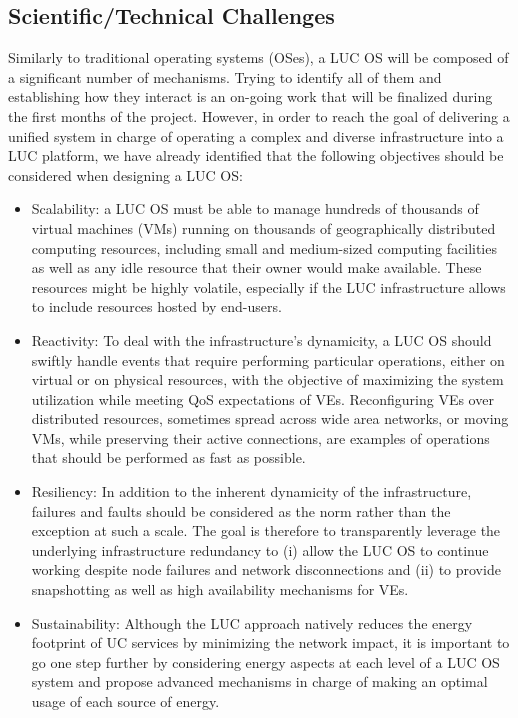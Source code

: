 \documentclass[11pt,a4paper,twoside]{article}
\begin{document}
\subsection{Scientific/Technical Challenges}
Similarly to traditional operating systems (OSes), a LUC OS will be composed of a
significant number of mechanisms. Trying to identify all of them and establishing how they
interact is an on-going work that will be finalized during the first months of the project. 
However, in order to reach the goal of delivering a unified system in charge of operating a complex and diverse
infrastructure into a LUC platform, we have already identified that the following
objectives should be considered when designing a LUC OS:
\begin{itemize} 
\item Scalability: a LUC OS must be able to manage hundreds of
  thousands of virtual machines (VMs) running on thousands of 
  geographically distributed computing resources, including small and
  medium-sized computing facilities as well as any idle resource that their owner would make available. These resources might be
  highly volatile, especially if the LUC infrastructure allows to include resources hosted by
  end-users.
\item Reactivity: To deal with the infrastructure's dynamicity, a LUC OS
  should swiftly handle events that require performing particular
  operations, either on virtual or on physical resources, with the
  objective of maximizing the system utilization while meeting QoS expectations of VEs. 
  Reconfiguring  VEs over distributed resources, sometimes spread across wide area networks, or moving VMs, 
  while preserving their active connections, are examples of operations that should be performed as fast as possible.
\item Resiliency: In addition to the inherent dynamicity of the
  infrastructure, failures and faults should be considered as the norm rather than the
exception at such a scale. The goal is therefore to transparently leverage the
underlying infrastructure redundancy to (i) allow the LUC OS to continue
working despite node failures and network disconnections and (ii) to provide
snapshotting as well as high availability mechanisms for VEs.
\item Sustainability: Although the LUC approach natively reduces the energy
footprint of UC services by minimizing the network impact, it is important to go one
step further by considering energy aspects at each level of a LUC OS
system and propose advanced mechanisms in charge of making an optimal usage of each source of energy. 

\end{itemize}
\end{document}
